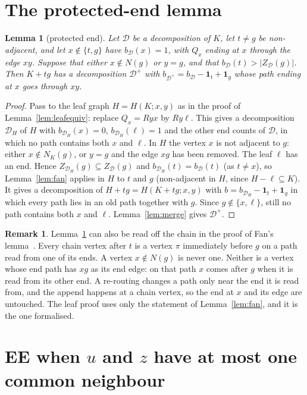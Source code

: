 \documentclass[11pt]{amsart}
\newtheorem{lemma}[theorem]{Lemma}
\theoremstyle{definition}
\newtheorem{remark}[theorem]{Remark}
\newcommand{\cD}{\mathcal D}
\begin{document}
\section{The protected-end lemma}\label{sec:protect}

\begin{lemma}[protected end]\label{lem:protect}
Let $\cD$ be a decomposition of $K$, let $t\ne g$ be non-adjacent, and let $x\notin\{t,g\}$ have
$b_\cD(x)=1$, with $Q_x$ ending at $x$ through the edge $xy$. Suppose that either $x\notin N(g)$ or
$y=g$, and that $b_\cD(t)>|Z_\cD(g)|$. Then $K+tg$ has a decomposition $\cD^+$ with
$b_{\cD^+}=b_\cD-\mathbf 1_t+\mathbf 1_g$ whose path ending at $x$ goes through $xy$.
\end{lemma}

\begin{proof}
Pass to the leaf graph $H=H(K;x,y)$ as in the proof of Lemma~\ref{lem:leafequiv}: replace $Q_x=Ryx$ by
$Ry\ell$. This gives a decomposition $\cD_H$ of $H$ with $b_{\cD_H}(x)=0$, $b_{\cD_H}(\ell)=1$ and the
other end counts of $\cD$, in which no path contains both $x$ and $\ell$. In $H$ the vertex $x$ is not
adjacent to $g$: either $x\notin N_K(g)$, or $y=g$ and the edge $xg$ has been removed. The leaf $\ell$
has an end. Hence $Z_{\cD_H}(g)\subseteq Z_\cD(g)$ and $b_{\cD_H}(t)=b_\cD(t)$ (as $t\ne x$), so
Lemma~\ref{lem:fan} applies in $H$ to $t$ and $g$ (non-adjacent in $H$, since $H-\ell\subseteq K$).
It gives a decomposition of $H+tg=H(K+tg;x,y)$ with $b=b_{\cD_H}-\mathbf 1_t+\mathbf 1_g$ in which every
path lies in an old path together with $g$. Since $g\notin\{x,\ell\}$, still no path contains both $x$
and $\ell$. Lemma~\ref{lem:merge} gives $\cD^+$.
\end{proof}

\begin{remark}
Lemma~\ref{lem:protect} can also be read off the chain in the proof of Fan's lemma~\cite[Lemma~2.2]{RD}.
Every chain vertex after $t$ is a vertex $\pi$ immediately before $g$ on a path read from one of its
ends. A vertex $x\notin N(g)$ is never one. Neither is a vertex whose end path has $xg$ as its end
edge: on that path $x$ comes after $g$ when it is read from its other end. A re-routing changes a path
only near the end it is read from, and the append happens at a chain vertex, so the end at $x$ and its
edge are untouched. The leaf proof uses only the statement of Lemma~\ref{lem:fan}, and it is the one
formalised.
\end{remark}

\section{EE when \texorpdfstring{$u$}{u} and \texorpdfstring{$z$}{z} have at most one common
neighbour}\label{sec:common}
\end{document}
